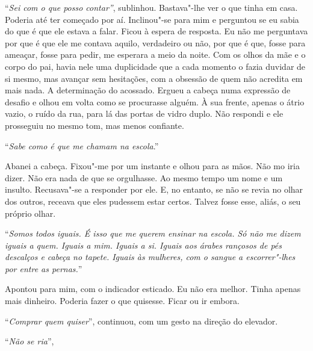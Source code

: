 ``\emph{Sei com o que posso contar''},
sublinhou. Bastava"-lhe ver o que tinha em casa. Poderia até ter
começado por aí. Inclinou"-se para mim e perguntou se eu sabia do que é
que ele estava a falar. Ficou à espera de resposta. Eu não me perguntava
por que é que ele me contava aquilo, verdadeiro ou não, por que é que,
fosse para ameaçar, fosse para pedir, me esperara a meio da noite. Com
os olhos da mãe e o corpo do pai, havia nele uma duplicidade que a cada
momento o fazia duvidar de si mesmo, mas avançar sem hesitações, com a
obsessão de quem não acredita em mais nada. A determinação do acossado.
Ergueu a cabeça numa expressão de desafio e olhou em volta como se
procurasse alguém. À sua frente, apenas o átrio vazio, o ruído da rua,
para lá das portas de vidro duplo. Não respondi e ele prosseguiu no
mesmo tom, mas menos confiante.

``\emph{Sabe como é que me chamam na escola}.''

Abanei a cabeça. Fixou"-me por um instante e olhou para as mãos. Não mo
iria dizer. Não era nada de que se orgulhasse. Ao mesmo tempo um nome e
um insulto. Recusava"-se a responder por ele. E, no entanto, se não se
revia no olhar dos outros, receava que eles pudessem estar certos.
Talvez fosse esse, aliás, o seu próprio olhar.

``\emph{Somos todos iguais. É isso que me querem ensinar na escola. Só
não me dizem iguais a quem. Iguais a mim. Iguais a si. Iguais aos árabes
rançosos de pés descalços e cabeça no tapete. Iguais às mulheres, com o
sangue a escorrer"-lhes por entre as pernas.}''

Apontou para mim, com o indicador esticado. Eu não era melhor. Tinha
apenas mais dinheiro. Poderia fazer o que quisesse. Ficar ou ir embora.

``\emph{Comprar quem quiser}'',
continuou, com um gesto na direção do elevador.

``\emph{Não se ria}'',

